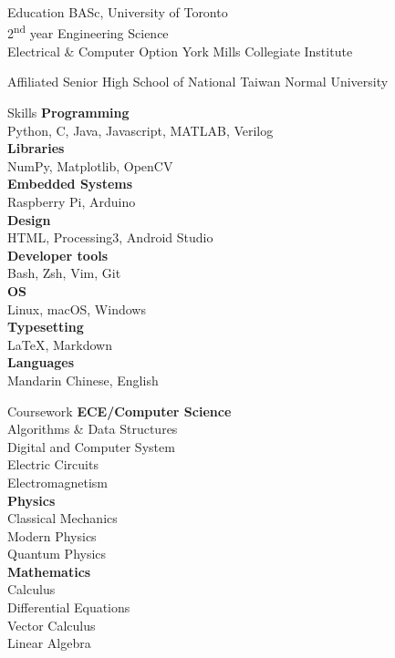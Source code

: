 \documentclass{my_resume} %
\begin{document}
\begin{minipage}[t]{0.3\textwidth}
    \begin{rSection}{Education}
        \textmd{BASc, University of Toronto}\\ 
        {\small 2\textsuperscript{nd} year Engineering Science\\
        Electrical \& Computer Option \vskip 5pt
        }
        \textmd{York Mills Collegiate Institute} \vskip 5pt 
                
        \textmd{Affiliated Senior High School of National Taiwan Normal University} 
   
    \end{rSection}
    \begin{rSection}{Skills}
        \textbf{Programming }\\ 
        Python, C, Java, Javascript, MATLAB, Verilog\\
        \textbf{Libraries}\\
        NumPy, Matplotlib, OpenCV\\
        \textbf{Embedded Systems } \\
        Raspberry Pi, Arduino \\
        \textbf{Design }\\ 
        HTML, Processing3, Android Studio\\ 
        \textbf{Developer tools}\\
         Bash, Zsh, Vim, Git\\
        \textbf{OS}\\
        Linux, macOS, Windows\\
        \textbf{Typesetting}\\
        \LaTeX, Markdown\\
        \textbf{Languages}\\
        Mandarin Chinese, English\\
    \end{rSection}
    

    \begin{rSection}{Coursework}
        \textbf{ECE/Computer Science}\\
        Algorithms \& Data Structures\\
        Digital and Computer System \\
        Electric Circuits\\
        Electromagnetism\\
        \textbf{Physics}\\
        Classical Mechanics\\
        Modern Physics\\
        Quantum Physics\\
        \textbf{Mathematics}\\
        Calculus\\
        Differential Equations\\
        Vector Calculus\\ 
        Linear Algebra\\   
    \end{rSection}

         
\end{minipage}
\end{document}
